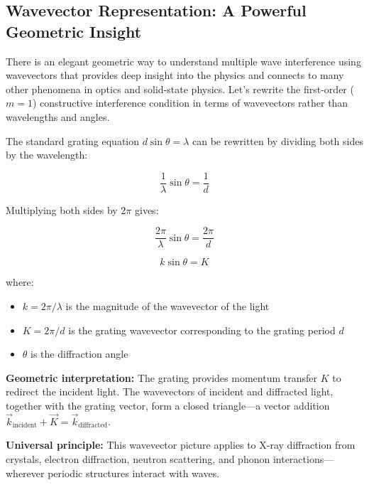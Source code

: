 \documentclass[
  a4paper,
]{book}
\providecommand{\tightlist}{%
  \setlength{\itemsep}{0pt}\setlength{\parskip}{0pt}}
\begin{document}
\subsection{Wavevector Representation: A Powerful Geometric
Insight}\label{wavevector-representation-a-powerful-geometric-insight}

There is an elegant geometric way to understand multiple wave
interference using wavevectors that provides deep insight into the
physics and connects to many other phenomena in optics and solid-state
physics. Let's rewrite the first-order (\(m=1\)) constructive
interference condition in terms of wavevectors rather than wavelengths
and angles.

The standard grating equation \(d\sin\theta = \lambda\) can be rewritten
by dividing both sides by the wavelength:

\[
\frac{1}{\lambda}\sin{\theta}= \frac{1}{d}
\]

Multiplying both sides by \(2\pi\) gives:

\[
\frac{2\pi}{\lambda}\sin{\theta}= \frac{2\pi}{d}
\]

\begin{tcolorbox}[enhanced jigsaw, breakable, toptitle=1mm, bottomrule=.15mm, colbacktitle=quarto-callout-tip-color!10!white, title=\textcolor{quarto-callout-tip-color}{\faLightbulb}\hspace{0.5em}{Wavevector Formulation of Grating Equation}, arc=.35mm, rightrule=.15mm, bottomtitle=1mm, opacityback=0, toprule=.15mm, coltitle=black, leftrule=.75mm, opacitybacktitle=0.6, colback=white, left=2mm, titlerule=0mm, colframe=quarto-callout-tip-color-frame]

\[k \sin{\theta}= K\]

where:

\begin{itemize}
\tightlist
\item
  \(k = 2\pi/\lambda\) is the magnitude of the wavevector of the light
\item
  \(K = 2\pi/d\) is the grating wavevector corresponding to the grating
  period \(d\)
\item
  \(\theta\) is the diffraction angle
\end{itemize}

\textbf{Geometric interpretation:} The grating provides momentum
transfer \(K\) to redirect the incident light. The wavevectors of
incident and diffracted light, together with the grating vector, form a
closed triangle---a vector addition
\(\vec{k}_{\text{incident}} + \vec{K} = \vec{k}_{\text{diffracted}}\).

\textbf{Universal principle:} This wavevector picture applies to X-ray
diffraction from crystals, electron diffraction, neutron scattering, and
phonon interactions---wherever periodic structures interact with waves.

\end{tcolorbox}
\end{document}
